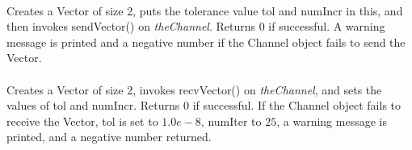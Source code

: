 \\ 
Creates a Vector of size 2, puts the tolerance value \p tol and \p numIncr
in this, and then invokes sendVector() on {\em
theChannel}. Returns $0$ if successful. A warning message is printed
and a negative number if the Channel object fails to send the Vector.\\ 

\\ 
Creates a Vector of size 2, invokes recvVector() on {\em
theChannel}, and sets the values of \p tol and \p numIncr.
Returns $0$ if successful. If the Channel object fails to receive the
Vector, \p tol is set to $1.0e-8$, \p numIter to $25$, a warning
message is printed, and a negative number returned.

